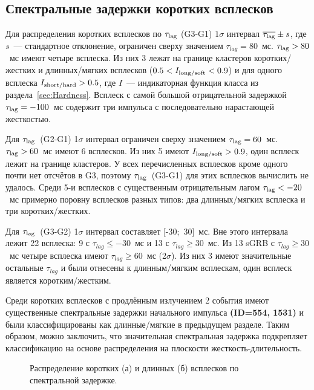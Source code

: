 \subsection{Спектральные задержки коротких всплесков}
Для распределения коротких всплесков по $\tau_{{\mathrm{lag}}}$ (G3-G1) $1\sigma$ 
интервал $\overline{\tau_{{\mathrm{lag}}}}\pm s$, где $s$~--- стандартное отклонение, 
ограничен сверху значением $\tau_{lag}=80$~мс. $\tau_{{\mathrm{lag}}} > 80$~мс  имеют четыре всплеска. 
Из них 3 лежат на границе кластеров коротких/жестких и длинных/мягких всплесков 
($0.5<I_{{\mathrm{long/soft}}}<0.9$) и для одного всплеска $I_{{\mathrm{short/hard}}}>0.5$, 
где $I$~--- индикаторная функция класса из раздела~\ref{sec:Hardness}. 
Всплеск с самой большой отрицательной задержкой $\tau_{{\mathrm{lag}}}=-100$~мс содержит три 
импульса с последовательно нарастающей жесткостью. 

Для $\tau_{{\mathrm{lag}}}$~(G2-G1) 1$\sigma$ интервал ограничен сверху значением $\tau_{{\mathrm{lag}}}=60$~мс. 
$\tau_{{\mathrm{lag}}} > 60$~мс  имеют 6 всплесков. Из них 5 имеют $I_{{\mathrm{long/soft}}}>0.9$, 
один всплеск лежит на границе кластеров. У всех перечисленных всплесков кроме 
одного почти нет отсчётов в G3, поэтому $\tau_{{\mathrm{lag}}}$~(G3-G1) для этих всплесков 
вычислить не удалось. Среди 5-и всплесков с существенным отрицательным лагом 
$\tau_{{\mathrm{lag}}} <-20$~мс примерно поровну всплесков разных типов: 
два длинных/мягких всплеска и три коротких/жестких.

Для $\tau_{{\mathrm{lag}}}$~(G3-G2) 1$\sigma$ интервал составляет [-30;~30]~мс. 
Вне этого интервала лежит 22 всплеска: 9 с $\tau_{lag} \leq -30$~мс и 13 с $\tau_{lag} \geq 30$~мс. 
Из 13 sGRB с $\tau_{lag} \geq 30$~мс четыре всплеска имеют  $\tau_{lag} \geq 60$~мс (2$\sigma$). 
Из них 3 имеют значительные остальные $\tau_{lag}$ и были отнесены к длинным/мягким всплескам, 
один всплеск является коротким/жестким.

Среди коротких всплесков с продлённым излучением 2 события имеют существенные 
спектральные задержки начального импульса \textbf{(ID=554, 1531)} и были 
классифицированы как длинные/мягкие в предыдущем разделе. Таким образом, 
можно заключить, что значительная спектральная задержка подкрепляет классификацию 
на основе распределения на плоскости жесткость-длительность.



\begin{figure}[h]
  \begin{minipage}[h]{0.5\textwidth}
  \end{minipage}
  \hfill
  \begin{minipage}[h]{0.5\textwidth}
  \end{minipage}
  \caption{Распределение коротких (а) и длинных (б) всплесков по спектральной задержке.}
  \label{img:LagDistrs}  
\end{figure}

